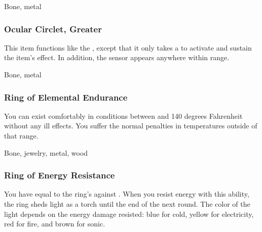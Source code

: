  


 Bone, metal


\lowercase{\hypertarget{item:Ocular Circlet, Greater}{}}\label{item:Ocular Circlet, Greater}
\hypertarget{item:Ocular Circlet, Greater}{\subsubsection{Ocular Circlet, Greater\hfill{}}}

This item functions like the , except that it only takes a  to activate and sustain the item's effect.
In addition, the sensor appears anywhere within \rngmed range.



 


 Bone, metal


\lowercase{\hypertarget{item:Ring of Elemental Endurance}{}}\label{item:Ring of Elemental Endurance}
\hypertarget{item:Ring of Elemental Endurance}{\subsubsection{Ring of Elemental Endurance\hfill{}}}

You can exist comfortably in conditions between  and 140 degrees Fahrenheit without any ill effects.
You suffer the normal penalties in temperatures outside of that range.



 


 Bone, jewelry, metal, wood


\lowercase{\hypertarget{item:Ring of Energy Resistance}{}}\label{item:Ring of Energy Resistance}
\hypertarget{item:Ring of Energy Resistance}{\subsubsection{Ring of Energy Resistance\hfill{}}}

You have  equal to the ring's  against .
When you resist energy with this ability, the ring sheds light as a torch until the end of the next round.
The color of the light depends on the energy damage resisted: blue for cold, yellow for electricity, red for fire, and brown for sonic.



